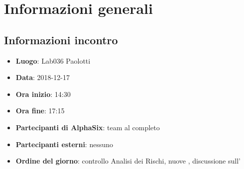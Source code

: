 \newcommand{\documento}{\VI}
\newcommand{\nomedocumentofisico}{VI\ 2018-12-17.pdf}
\newcommand{\redazione}{\TG}
\newcommand{\verifica}{\CV}
\newcommand{\approvazione}{\MM}
\newcommand{\versione}{1.0.0}
\newcommand{\uso}{Interno}
\newcommand{\destinateTo}{\TV, \\ & \RC, \\ & \II}
\newcommand{\datacreazione}{18 dicembre 2018}
\newcommand{\datamodifica}{19 dicembre 2018}
\newcommand{\stato}{Approvato}

\def\TABELLE{false}	%
\def\FIGURE{false} 	%






    

    	
    
    \section{Informazioni generali}
		\subsection{Informazioni incontro}
			\begin{itemize}
				\item { \textbf{Luogo}: Lab036 Paolotti}
				\item { \textbf{Data}: 2018-12-17}
				\item { \textbf{Ora inizio}: 14:30}
				\item { \textbf{Ora fine}: 17:15}
				\item { \textbf{Partecipanti di AlphaSix}: team al completo}
				\item { \textbf{Partecipanti esterni}: nessuno}
				\item { \textbf{Ordine del giorno}: controllo Analisi dei Rischi, nuove \NdP, discussione sull'\AdR}
			\end{itemize}

